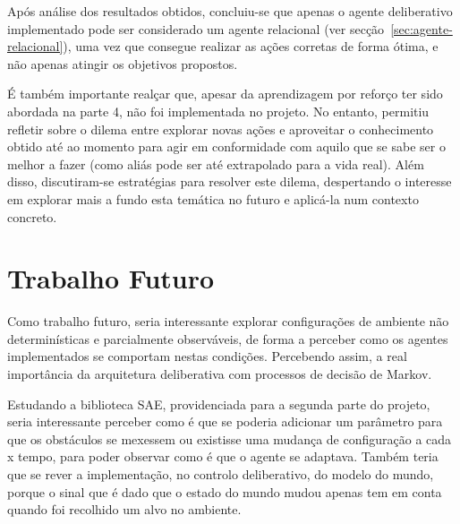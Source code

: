Após análise dos resultados obtidos, concluiu-se que apenas o agente deliberativo implementado pode ser considerado um agente relacional (ver secção~\ref{sec:agente-relacional}), uma vez que consegue realizar as ações corretas de forma ótima, e não apenas atingir os objetivos propostos.

 É também importante realçar que, apesar da aprendizagem por reforço ter sido abordada na parte 4, não foi implementada no projeto.
No entanto, permitiu refletir sobre o dilema entre explorar novas ações e aproveitar o conhecimento obtido até ao momento para agir em conformidade com aquilo que se sabe ser o melhor a fazer (como aliás pode ser até extrapolado para a vida real).
Além disso, discutiram-se estratégias para resolver este dilema, despertando o interesse em explorar mais a fundo esta temática no futuro e aplicá-la num contexto concreto.


\section{Trabalho Futuro}\label{sec:trabalho-futuro}

Como trabalho futuro, seria interessante explorar configurações de ambiente não determinísticas e parcialmente observáveis, de forma a perceber como os agentes implementados se comportam nestas condições.
Percebendo assim, a real importância da arquitetura deliberativa com processos de decisão de Markov.

Estudando a biblioteca SAE, providenciada para a segunda parte do projeto, seria interessante perceber como é que se poderia adicionar um parâmetro para que os obstáculos se mexessem ou existisse uma mudança de configuração a cada x tempo, para poder observar como é que o agente se adaptava.
Também teria que se rever a implementação, no controlo deliberativo, do modelo do mundo, porque o sinal que é dado que o estado do mundo mudou apenas tem em conta quando foi recolhido um alvo no ambiente.
